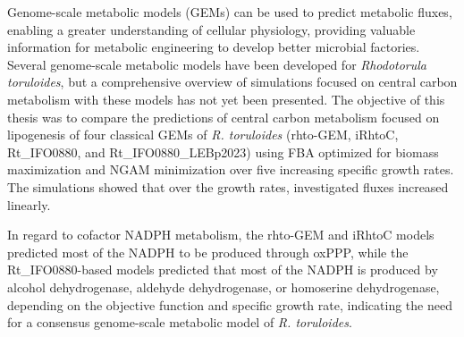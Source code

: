 Genome-scale metabolic models (GEMs) can be used to predict metabolic fluxes, enabling a greater understanding of cellular physiology, providing valuable information for metabolic engineering to develop better microbial factories. Several genome-scale metabolic models have been developed for \textit{Rhodotorula toruloides}, but a comprehensive overview of simulations focused on central carbon metabolism with these models has not yet been presented.
The objective of this thesis was to compare the predictions of central carbon metabolism focused on lipogenesis of four classical GEMs of \textit{R. toruloides} (rhto-GEM, iRhtoC, Rt\_IFO0880, and Rt\_IFO0880\_LEBp2023) using FBA optimized for biomass maximization and NGAM minimization over five increasing specific growth rates. The simulations showed that over the growth rates, investigated fluxes increased linearly. 

In regard to cofactor NADPH metabolism, the rhto-GEM and iRhtoC models predicted most of the NADPH to be produced through oxPPP, while the Rt\_IFO0880-based models predicted that most of the NADPH is produced by alcohol dehydrogenase, aldehyde dehydrogenase, or homoserine dehydrogenase, depending on the objective function and specific growth rate, indicating the need for a consensus genome-scale metabolic model of \textit{R. toruloides}.


